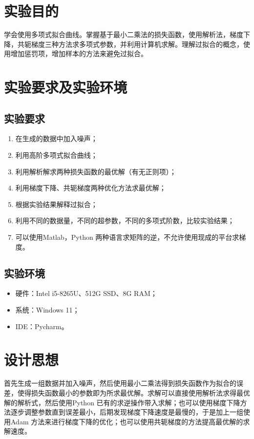 \documentclass[withoutpreface,bwprint]{cumcmthesis}
\begin{document}
\section{实验目的}
学会使用多项式拟合曲线。掌握基于最小二乘法的损失函数，使用解析法，梯度下降，共轭梯度三种方法求多项式参数，并利用计算机求解。理解过拟合的概念，使用增加惩罚项，增加样本的方法来避免过拟合。

\section{实验要求及实验环境}
\subsection{实验要求}
\begin{enumerate}
\setlength{\itemindent}{1.5em}
\item 在生成的数据中加入噪声；
\item 利用高阶多项式拟合曲线；
\item 利用解析解求两种损失函数的最优解（有无正则项）；
\item 利用梯度下降、共轭梯度两种优化方法求最优解；
\item 根据实验结果解释过拟合；
\item 利用不同的数据量，不同的超参数，不同的多项式阶数，比较实验结果；
\item 可以使用Matlab，Python 两种语言求矩阵的逆，不允许使用现成的平台求梯度。
\end{enumerate}

\subsection{实验环境}
\begin{itemize}
\setlength{\itemindent}{1.5em}
\item 硬件：Intel i5-8265U、512G SSD、8G RAM；
\item 系统：Windows 11；
\item IDE：Pycharm。
\end{itemize}

\section{设计思想}
首先生成一组数据并加入噪声，然后使用最小二乘法得到损失函数作为拟合的误差，使得损失函数最小的参数即为所求最优解。求解可以直接使用解析法求得最优解的解析式，然后使用Python 已有的求逆操作带入求解；也可以使用梯度下降方法逐步调整参数直到误差最小，后期发现梯度下降速度是最慢的，于是加上一组使用Adam 方法来进行梯度下降的优化；也可以使用共轭梯度的方法提高最优解的求解速度。
\end{document}
